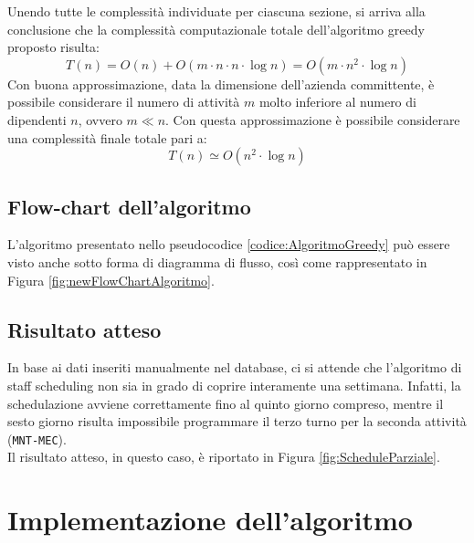 Unendo tutte le complessità individuate per ciascuna sezione, si arriva alla conclusione che la complessità computazionale totale dell'algoritmo greedy proposto risulta:
\begin{equation}
	T(n)=O(n)+O(m \cdot n \cdot n\cdot \log{n})=O(m\cdot n^2 \cdot \log{n})
\end{equation}
Con buona approssimazione, data la dimensione dell'azienda committente, è possibile considerare il numero di attività $m$ molto inferiore al numero di dipendenti $n$, ovvero $m \ll n$. Con questa approssimazione è possibile considerare una complessità finale totale pari a:
\begin{equation}
	T(n)\simeq O(n^2 \cdot \log{n})
\end{equation}
\subsection{Flow-chart dell'algoritmo}
L'algoritmo presentato nello pseudocodice \ref{codice:AlgoritmoGreedy} può essere visto anche sotto forma di diagramma di flusso, così come rappresentato in Figura \ref{fig:newFlowChartAlgoritmo}.
\subsection{Risultato atteso}
In base ai dati inseriti manualmente nel database, ci si attende che l'algoritmo di staff scheduling non sia in grado di coprire interamente una settimana. Infatti, la schedulazione avviene correttamente fino al quinto giorno compreso, mentre il sesto giorno risulta impossibile programmare il terzo turno per la seconda attività (\verb|MNT-MEC|).\\
Il risultato atteso, in questo caso, è riportato in Figura \ref{fig:ScheduleParziale}.
\section{Implementazione dell'algoritmo}
